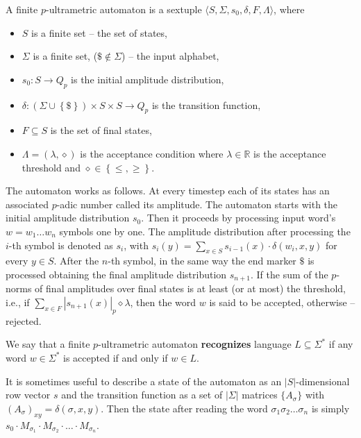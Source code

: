 \documentclass{llncs}
\begin{document}
\begin{definition}
A finite $p$-ultrametric automaton is a sextuple $\langle S, \Sigma, s_0, \delta, F, \Lambda \rangle$, where
\begin{itemize}
  \item $S$ is a finite set -- the set of states,
  \item $\Sigma$ is a finite set, ($\$ \notin \Sigma$) -- the input alphabet,
  \item $s_0:S \rightarrow Q_p$ is the initial amplitude distribution,
  \item $\delta: \left( \Sigma \cup \left\{ \$ \right\} \right) \times S \times S \rightarrow Q_p$ is the transition function,
  \item $F \subseteq S$ is the set of final states,
  \item $\Lambda = \left( \lambda, \diamond \right)$ is the acceptance condition where $\lambda \in \mathbb{R}$ is the acceptance threshold and $\diamond \in \left\{ \leq, \geq \right\}$.
\end{itemize}
The automaton works as follows.
At every timestep each of its states has an associated $p$-adic number called its amplitude.
The automaton starts with the initial amplitude distribution $s_0$.
Then it proceeds by processing input word's $w = w_1 \ldots w_n$ symbols one by one.
The amplitude distribution after processing the $i$-th symbol is denoted as $s_i$, with
$s_i(y) = \sum_{x \in S}{s_{i-1}(x) \cdot \delta \left( w_i, x, y \right) }$ for every $y \in S$.
After the $n$-th symbol, in the same way the end marker $\$$ is processed obtaining the final amplitude distribution $s_{n+1}$.
If the sum of the $p$-norms of final amplitudes over final states is at least (or at most) the threshold, i.e., if $\sum_{x \in F}{\left| s_{n+1}(x) \right|_p} \diamond \lambda$, then the word $w$ is said to be accepted, otherwise -- rejected.
\end{definition}

\begin{definition}
We say that a finite $p$-ultrametric automaton {\bf recognizes} language $L \subseteq \Sigma^{*}$ if any word $w \in  \Sigma^{*}$ is accepted if and only if $w \in L$.
\end{definition}

It is sometimes useful to describe a state of the automaton as an $|S|$-dimensi\-onal row vector $s$ and the transition function as a set of $|\Sigma|$ matrices $\{A_\sigma\}$ with $(A_\sigma)_{xy}=\delta(\sigma, x, y)$. Then the state after reading the word $\sigma_1\sigma_2\ldots \sigma_n$ is simply $s_0\cdot M_{\sigma_1} \cdot M_{\sigma_2} \cdot \ldots \cdot M_{\sigma_n}$.
\end{document}
